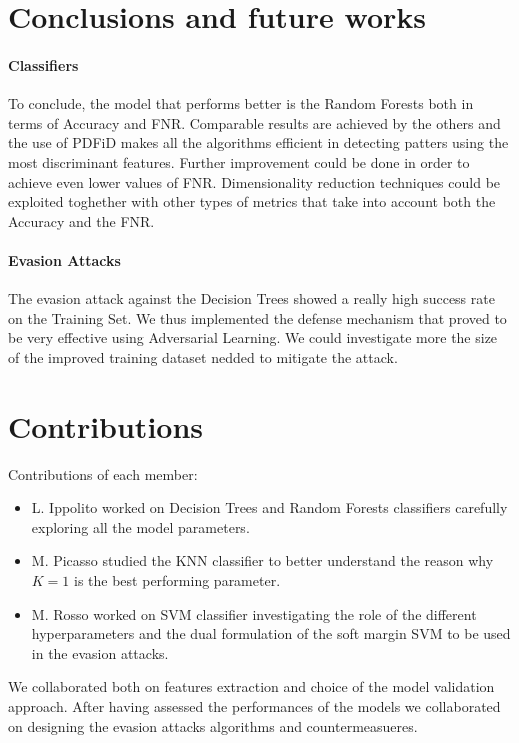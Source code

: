 \documentclass[twocolumn, switch]{article} %
\begin{document}
\section{Conclusions and future works}
\label{sec:conclusions}
\paragraph{Classifiers}
To conclude, the model that performs better is the Random Forests both in terms of Accuracy and FNR. Comparable results are achieved by the others and the use of PDFiD makes all the algorithms efficient in detecting patters using the most discriminant features. Further improvement could be done in order to achieve even lower values of FNR. Dimensionality reduction techniques could be exploited toghether with other types of metrics that take into account both the Accuracy and the FNR.
\vspace{-10pt}
\paragraph{Evasion Attacks}
The evasion attack against the Decision Trees showed a really high success rate on the Training Set. We thus implemented the defense mechanism that proved to be very effective using Adversarial Learning. We could investigate more the size of the improved training dataset nedded to mitigate the attack.

\section{Contributions}
\label{sec:contributions}
Contributions of each member:
\begin{itemize}
	\item L. Ippolito worked on Decision Trees and Random Forests classifiers carefully exploring all the model parameters. 
	\item M. Picasso studied the KNN classifier to better understand the reason why $K=1$ is the best performing parameter.
	\item M. Rosso worked on SVM classifier investigating the role of the different hyperparameters and the dual formulation of the soft margin SVM to be used in the evasion attacks.
\end{itemize}
We collaborated both on features extraction and choice of the model validation approach. After having assessed the performances of the models we collaborated on designing the evasion attacks algorithms and countermeasueres.
\end{document}
